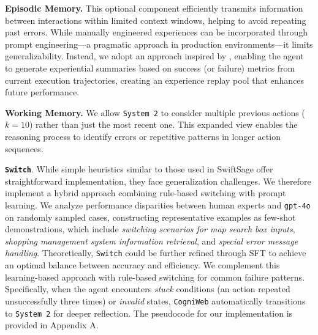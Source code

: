 \documentclass{article}
\begin{document}
\textbf{Episodic Memory.} This optional component efficiently transmits information between interactions within limited context windows, helping to avoid repeating past errors. While manually engineered experiences can be incorporated through prompt engineering—a pragmatic approach in production environments—it limits generalizability. Instead, we adopt an approach inspired by \citet{shinn2023reflexionlanguageagentsverbal}, enabling the agent to generate experiential summaries based on success (or failure) metrics from current execution trajectories, creating an experience replay pool that enhances future performance.

\textbf{Working Memory.} We allow \texttt{System 2} to consider multiple previous actions ($k=10$) rather than just the most recent one. This expanded view enables the reasoning process to identify errors or repetitive patterns in longer action sequences.

\textbf{\texttt{Switch}}. While simple heuristics similar to those used in SwiftSage \citep{lin2023swiftsage} offer straightforward implementation, they face generalization challenges. We therefore implement a hybrid approach combining rule-based switching with prompt learning. We analyze performance disparities between human experts and \texttt{gpt-4o} on randomly sampled cases, constructing representative examples as few-shot demonstrations, which include \textit{switching scenarios for map search box inputs}, \textit{shopping management system information retrieval}, and \textit{special error message handling}. Theoretically, \texttt{Switch} could be further refined through SFT to achieve an optimal balance between accuracy and efficiency. We complement this learning-based approach with rule-based switching for common failure patterns. Specifically, when the agent encounters \textit{stuck} conditions (an action repeated unsuccessfully three times) or \textit{invalid} states, \texttt{CogniWeb} automatically transitions to \texttt{System 2} for deeper reflection. The pseudocode for our implementation is provided in Appendix A.
\end{document}
